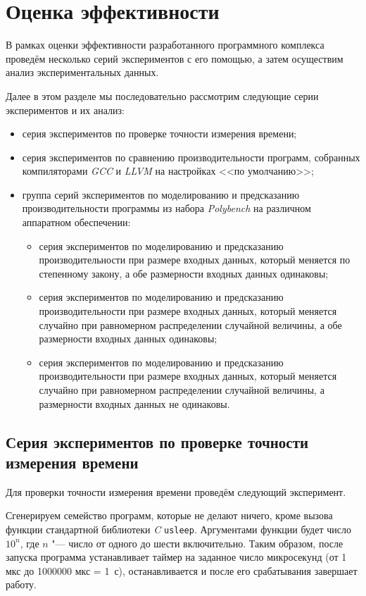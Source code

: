 \section{Оценка эффективности}
В рамках оценки эффективности разработанного программного комплекса проведём несколько серий экспериментов с его помощью, а затем осуществим анализ экспериментальных данных.

Далее в этом разделе мы последовательно рассмотрим следующие серии экспериментов и их анализ:
\begin{itemize}
    \item серия экспериментов по проверке точности измерения времени;
    \item серия экспериментов по сравнению производительности программ, собранных компиляторами \textit{GCC} и \textit{LLVM} на настройках <<по умолчанию>>;
    \item группа серий экспериментов по моделированию и предсказанию производительности программы из набора \textit{Polybench} на различном аппаратном обеспечении:
    \begin{itemize}
        \item серия экспериментов по моделированию и предсказанию производительности при размере входных данных, который меняется по степенному закону, а обе размерности входных данных одинаковы;
        \item серия экспериментов по моделированию и предсказанию производительности при размере входных данных, который меняется случайно при равномерном распределении случайной величины, а обе размерности входных данных одинаковы;
        \item серия экспериментов по моделированию и предсказанию производительности при размере входных данных, который меняется случайно при равномерном распределении случайной величины, а размерности входных данных не одинаковы.
    \end{itemize}
\end{itemize}

\subsection{Серия экспериментов по проверке точности измерения времени}
\label{ssec:series-accuracy}
Для проверки точности измерения времени проведём следующий эксперимент.

Сгенерируем семейство программ, которые не делают ничего, кроме вызова функции стандартной библиотеки \textit{C} \texttt{usleep}. Аргументами функции будет число $10^n$, где $n$ "--- число от одного до шести включительно. Таким образом, после запуска программа устанавливает таймер на заданное число микросекунд (от 1 мкс до 1000000 мкс = 1~с), останавливается и после его срабатывания завершает работу.

